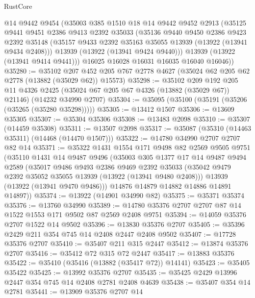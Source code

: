\begin{lexlean}{RustCore}
\begin{coremodule}
      @14
      @9442
      @9454
      (@35003
        @385
        @1510
        @18
        @14
        @9442
        @9452
        @2913
        (@35125
          @9441
          @9451
          @2386
          @9413
          @2392
          @35033
          (@35136
            @9440
            @9450
            @2386
            @9423
            @2392
            @35148
            (@35157 @9433 @2392 @35163 @35055 @13939 (@13922 (@13941 @9434 @2408)))
            @13939
            (@13922 (@13941 @9424 @9440)))
          @13939
          (@13922 (@13941 @9414 @9441)))
        @16025
        @16028
        @16031
        @16035
        @16040
        @16046))
@35280 := @35102
    @207
    @452
    @205
    @767
    @2778
    @4627
    (@35024 @62 @205 @62 @2778 (@13882 (@35029 @62)) @15573)
@35298 := @35102
    @209
    @192
    @205
    @11
    @4326
    @2425
    (@35024 @67 @205 @67 @4326 (@13882 (@35029 @67)) @21146)
    (@14232 @34990 @2707)
@35304 := @35095 (@35100 (@35191 (@35206 (@35265 (@35280 @35298)))))
@35305 := @13412 @1507
@35306 := @13609 @35305
@35307 := @35304 @35306
@35308 := @13483 @2098
@35310 := @35307 (@14459 @35308)
@35311 := @13507 @2098
@35317 := @35087 (@35310 (@14463 @35311) (@14468 (@14470 @1507)))
@35322 := @14780 @34990 @2707 @2707 @82 @14
@35371 := @35322
    @1431
    @1554
    @171
    @9498
    @82
    @2569
    @9505
    @9751
    (@35110
      @1431
      @14
      @9487
      @9496
      (@35003
        @305
        @1377
        @17
        @14
        @9487
        @9494
        @2589
        (@35017
          @9486
          @9493
          @2386
          @9469
          @2392
          @35033
          (@35042 @9479 @2392 @35052 @35055 @13939 (@13922 (@13941 @9480 @2408)))
          @13939
          (@13922 (@13941 @9470 @9486)))
        @14876
        @14879
        @14882
        @14886
        @14891
        @14897))
@35374 := @13922 (@14901 @34990 @82)
@35375 := @35371 @35374
@35376 := @13760 @34990
@35389 := @14780 @35376 @2707 @2707 @87 @14 @1522 @1553 @171 @9502 @87 @2569 @2408 @9751
@35394 := @14059 @35376 @2707 @1522 @14 @9502
@35396 := @13830 @35376 @2707
@35405 := @35396 @2429 @211 @354 @745 @14 @2408 @2447 @2408 @9502
@35407 := @17728 @35376 @2707
@35410 := @35407 @211 @315 @2447
@35412 := @13874 @35376 @2707
@35416 := @35412 @72 @315 @72 @2447
@35417 := @13883 @35376
@35422 := @35410 (@35416 (@13882 (@35417 @72)) @14141)
@35423 := @35405 @35422
@35425 := @13992 @35376 @2707
@35435 := @35425 @2429 @13996 @2447 @354 @745 @14 @2408 @2781 @2408 @4639
@35438 := @35407 @354 @14 @2781
@35441 := @13909 @35376 @2707 @14

\end{coremodule}
\end{lexlean}
